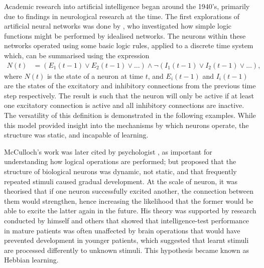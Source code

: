 Academic research into artificial intelligence began around the 1940's,
primarily due to findings in neurological research at the time.
The first explorations of artificial neural networks was done by
\cite{McCulloch:1943:Logical}, who investigated how simple logic functions
might be performed by idealised networks.
The neurons within these networks operated using some basic logic rules, applied
to a discrete time system which, can be summarised using the expression
\begin{align*}
    N(t) &= (E_1(t-1) \vee E_2(t-1) \vee \dots)
        \wedge \neg(I_1(t-1) \vee I_2(t-1) \vee \dots),
\end{align*}
where $N(t)$ is the state of a neuron at time $t$, and $E_i(t-1)$ and $I_i(t-1)$
are the states of the excitatory and inhibitory connections from the previous
time step respectively.
The result is such that the neuron will only be active if at least one
excitatory connection is active and all inhibitory connections are inactive.
The versatility of this definition is demonstrated in the following examples.
While this model provided insight into the mechanisms by which neurons operate,
the structure was static, and incapable of learning.



McCulloch's work was later cited by psychologist \cite{Hebb:1949:Organization},
as important for understanding how logical operations are performed; but
proposed that the structure of biological neurons was dynamic, not static, and
that frequently repeated stimuli caused gradual development.
At the scale of neuron, it was theorised that if one neuron successfully
excited another, the connection between them would strengthen, hence
increasing the likelihood that the former would be able to excite the latter
again in the future.
His theory was supported by research conducted by himself and others that showed
that intelligence-test performance in mature patients was often unaffected by
brain operations that would have prevented development in younger patients,
which suggested that learnt stimuli are processed differently to unknown
stimuli.
This hypothesis became known as Hebbian learning.



